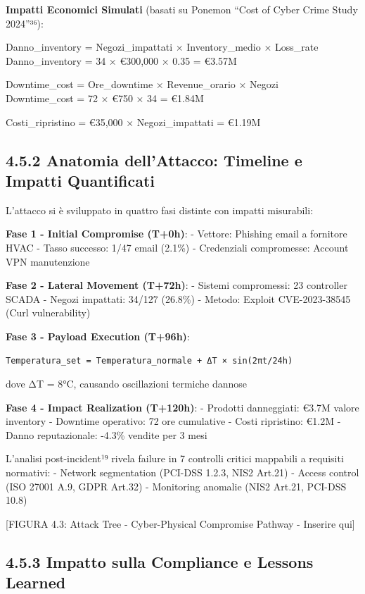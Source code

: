 \documentclass[12pt,a4paper,oneside]{book}
\numberwithin{figure}{chapter} %
\numberwithin{table}{chapter}  %
\begin{document}
\textbf{Impatti Economici Simulati} (basati su Ponemon ``Cost of Cyber
Crime Study 2024''³⁶):

Danno\_inventory = Negozi\_impattati × Inventory\_medio × Loss\_rate\\
Danno\_inventory = 34 × €300,000 × 0.35 = €3.57M

Downtime\_cost = Ore\_downtime × Revenue\_orario × Negozi\\
Downtime\_cost = 72 × €750 × 34 = €1.84M

Costi\_ripristino = €35,000 × Negozi\_impattati = €1.19M

\subsection{4.5.2 Anatomia dell'Attacco: Timeline e Impatti
Quantificati}\label{anatomia-dellattacco-timeline-e-impatti-quantificati}

L'attacco si è sviluppato in quattro fasi distinte con impatti
misurabili:

\textbf{Fase 1 - Initial Compromise (T+0h)}: - Vettore: Phishing email a
fornitore HVAC - Tasso successo: 1/47 email (2.1\%) - Credenziali
compromesse: Account VPN manutenzione

\textbf{Fase 2 - Lateral Movement (T+72h)}: - Sistemi compromessi: 23
controller SCADA - Negozi impattati: 34/127 (26.8\%) - Metodo: Exploit
CVE-2023-38545 (Curl vulnerability)

\textbf{Fase 3 - Payload Execution (T+96h)}:

\begin{verbatim}
Temperatura_set = Temperatura_normale + ΔT × sin(2πt/24h)
\end{verbatim}

dove ΔT = 8°C, causando oscillazioni termiche dannose

\textbf{Fase 4 - Impact Realization (T+120h)}: - Prodotti danneggiati:
€3.7M valore inventory - Downtime operativo: 72 ore cumulative - Costi
ripristino: €1.2M - Danno reputazionale: -4.3\% vendite per 3 mesi

L'analisi post-incident¹⁹ rivela failure in 7 controlli critici
mappabili a requisiti normativi: - Network segmentation (PCI-DSS 1.2.3,
NIS2 Art.21) - Access control (ISO 27001 A.9, GDPR Art.32) - Monitoring
anomalie (NIS2 Art.21, PCI-DSS 10.8)

{[}FIGURA 4.3: Attack Tree - Cyber-Physical Compromise Pathway -
Inserire qui{]}

\subsection{4.5.3 Impatto sulla Compliance e Lessons
Learned}\label{impatto-sulla-compliance-e-lessons-learned}
\end{document}
